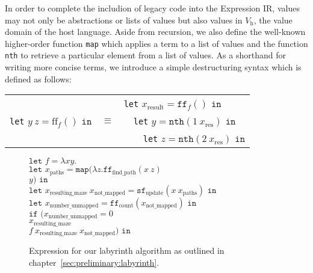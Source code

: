 In order to complete the includion of legacy code into the Expression IR, values may not only be abstractions or lists of values but also values in $V_\text{h}$, the value domain of the host language.
Aside from recursion, we also define the well-known higher-order function \texttt{map} which applies a term to a list of values and the function \texttt{nth} to retrieve a particular element from a list of values.
As a shorthand for writing more concise terms, we introduce a simple destructuring syntax which is defined as follows:
\begin{center}
    \begin{tabular}{l c l}
        && \texttt{let} $x_{\text{result}} = \texttt{ff}_f() \texttt{ in}$\\
        \texttt{let} $y\ z = \text{ff}_f() \texttt{ in}$ & $\equiv$ & \ \ \texttt{let} $y = \texttt{nth}(1\ x_{\text{res}}) \texttt{ in}$\\
        && \ \ \ \ \texttt{let} $z = \texttt{nth}(2\ x_{\text{res}}) \texttt{ in}$\\
    \end{tabular}
\end{center}

\begin{figure}
    $\texttt{let } f = \lambda x y.$\\
    \hspace*{.3cm}$\texttt{let } x_\text{paths} = \texttt{map} (\lambda z.\texttt{ff}_\text{find\_path} (x\ z)$\\
    \hspace*{3.2cm}$y) \texttt{ in}$\\
    \hspace*{.6cm}$\texttt{let } x_\text{resulting\_maze}\ x_\text{not\_mapped} = \texttt{sf}_\text{update}(x\ x_\text{paths}) \texttt{ in}$\\
    \hspace*{.9cm}$\texttt{let } x_\text{number\_unmapped} = \texttt{ff}_\text{count} (x_\text{not\_mapped}) \texttt{ in}$\\
    \hspace*{1.2cm}$\texttt{if } (x_\text{number\_unmapped} = 0$\\
    \hspace*{2cm}$x_\text{resulting\_maze}$\\
    \hspace*{2cm}$f\ x_\text{resulting\_maze}\ x_\text{not\_mapped}) \texttt{ in}$\\
    \caption{Expression for our labyrinth algorithm as outlined in chapter~\ref{sec:preliminary:labyrinth}.}%
    \label{fig:transformations:ir-first-stage}
\end{figure}


